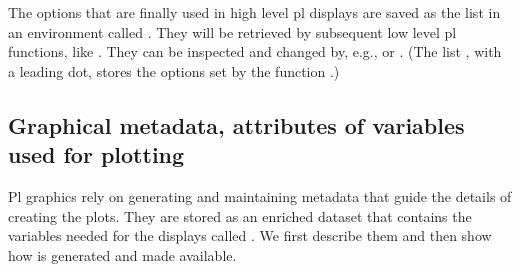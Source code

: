 \documentclass[11pt]{article}
\begin{document}
The options that are finally used in high level pl displays are saved 
as the list  in an environment called .
They will be retrieved by subsequent low level pl functions,
like .
They can be inspected and changed by, e.g.,
 or .
(The list , with a leading dot, stores the options set by
the function .)


\subsection{Graphical metadata, attributes of variables used for plotting}
\label{plproperties}
Pl graphics rely on generating and maintaining metadata that guide the
details of creating the plots. 
They are stored as an enriched dataset that contains the variables needed
for the displays called . We first describe them and then show
how  is generated and made available.
\end{document}
